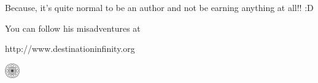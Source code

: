 \documentclass[
    coverheight=148mm, coverwidth=105mm, spinewidth=10mm,
    bleedwidth=31mm,
    markcolor=white,
    foldingmargin=true, 12pt
]{bookcover}
\begin{document}
\begin{bookcover}
{        Because, it's quite normal to be an author and not be earning anything at all!!
        :D

        You can follow his misadventures at

        \centerline{http://www.destinationinfinity.org}

        \vfill

        \begin{center}
            \includegraphics[width=18pt]{logo.pdf}
        \end{center}
    }
\end{bookcover}
\end{document}
